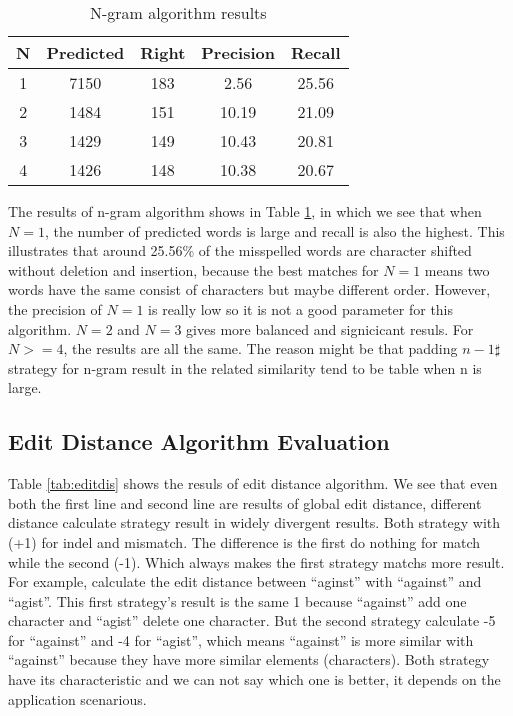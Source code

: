 \documentclass[11pt]{article}
\begin{document}
\begin{table}
	\centering
	\small
	\begin{tabular}{c|c|c|c|c}
		\hline
		N &Predicted & Right & Precision & Recall \\
		\hline
		1 & 7150 & 183 & 2.56 & 25.56 \\
		\hline
		2 & 1484 & 151 & 10.19 & 21.09  \\
		\hline
		3 & 1429 & 149 & 10.43 & 20.81 \\
		\hline
		4 & 1426 & 148 & 10.38 & 20.67 \\
		\hline
	\end{tabular}
	\caption{N-gram algorithm results}
	\label{tab:ngram}
\end{table}

The results of n-gram algorithm shows in Table \ref{tab:ngram}, in which we see that when $N=1$, the number of predicted words is large and recall is also the highest. This illustrates that around 25.56\% of the misspelled words are character shifted without deletion and insertion, because the best matches for $N=1$ means two words have the same consist of characters but maybe different order. However, the precision of $N=1$ is really low so it is not a good parameter for this algorithm. $N=2$ and $N=3$ gives more balanced and signicicant resuls. For $N>=4$, the results are all the same. The reason might be that padding $n-1 \sharp$ strategy for n-gram result in the related similarity tend to be table when n is large. 

\subsection{Edit Distance Algorithm Evaluation}

Table \ref{tab:editdis} shows the resuls of edit distance algorithm. We see that even both the first line and second line are results of global edit distance, different distance calculate strategy result in widely divergent results. Both strategy with (+1) for indel and mismatch. The difference is the first do nothing for match while the second (-1). Which always makes the first strategy matchs more result. For example, calculate the edit distance between ``aginst'' with ``against'' and ``agist''. This first strategy's result is the same 1 because ``against'' add one character and ``agist'' delete one character. But the second strategy calculate -5 for ``against'' and -4 for ``agist'', which means ``against'' is more similar with ``against'' because they have more similar elements (characters). Both strategy have its characteristic and we can not say which one is better, it depends on the application scenarious.
\end{document}
